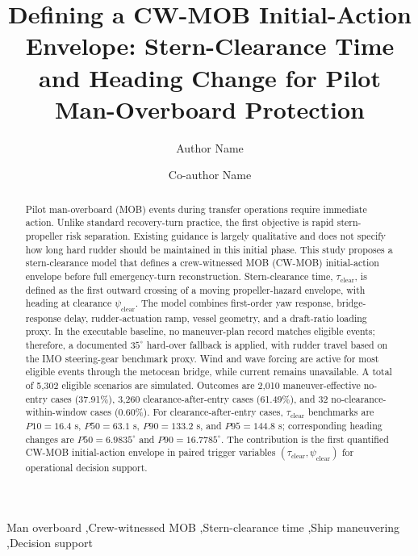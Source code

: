 \documentclass[preprint,12pt]{elsarticle}
\begin{document}
\begin{frontmatter}

\title{Defining a CW-MOB Initial-Action Envelope: Stern-Clearance Time and Heading Change for Pilot Man-Overboard Protection}

\author[inst1]{Author Name}
\author[inst1]{Co-author Name}
\address[inst1]{Affiliation, City, Country}

\begin{abstract}
Pilot man-overboard (MOB) events during transfer operations require immediate action. Unlike standard recovery-turn practice, the first objective is rapid stern-propeller risk separation. Existing guidance is largely qualitative and does not specify how long hard rudder should be maintained in this initial phase. This study proposes a stern-clearance model that defines a crew-witnessed MOB (CW-MOB) initial-action envelope before full emergency-turn reconstruction. Stern-clearance time, $\tau_{\mathrm{clear}}$, is defined as the first outward crossing of a moving propeller-hazard envelope, with heading at clearance $\psi_{\mathrm{clear}}$. The model combines first-order yaw response, bridge-response delay, rudder-actuation ramp, vessel geometry, and a draft-ratio loading proxy. In the executable baseline, no maneuver-plan record matches eligible events; therefore, a documented $35^{\circ}$ hard-over fallback is applied, with rudder travel based on the IMO steering-gear benchmark proxy. Wind and wave forcing are active for most eligible events through the metocean bridge, while current remains unavailable. A total of 5{,}302 eligible scenarios are simulated. Outcomes are 2{,}010 maneuver-effective no-entry cases (37.91\%), 3{,}260 clearance-after-entry cases (61.49\%), and 32 no-clearance-within-window cases (0.60\%). For clearance-after-entry cases, $\tau_{\mathrm{clear}}$ benchmarks are $P10=16.4$ s, $P50=63.1$ s, $P90=133.2$ s, and $P95=144.8$ s; corresponding heading changes are $P50=6.9835^{\circ}$ and $P90=16.7785^{\circ}$. The contribution is the first quantified CW-MOB initial-action envelope in paired trigger variables $(\tau_{\mathrm{clear}},\psi_{\mathrm{clear}})$ for operational decision support.
\end{abstract}

\begin{keyword}
Man overboard \sep Crew-witnessed MOB \sep Stern-clearance time \sep Ship maneuvering \sep Decision support
\end{keyword}

\end{frontmatter}
\end{document}
